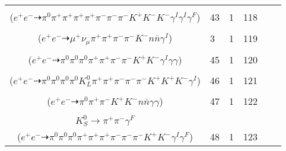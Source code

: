 \documentclass[landscape]{article}
\newcounter{rownumbers}
\newcommand\rn{\stepcounter{rownumbers}\arabic{rownumbers}}
\newcommand{\EOL}{\\} %
\newcommand{\topoTags}[1]{#1} %
\begin{document}
\begin{longtable}{clcccc}
\rn & \makecell[l]{ $ 
e^{+} e^{-} \rightarrow \pi^{0} \rho^{0} \pi^{+} \pi^{-} K^{0} \bar{K}^{*} \phi \gamma^{I} \gamma^{I} ,
\rho^{0} \rightarrow \pi^{+} \pi^{-} \gamma^{F} ,
K^{0} \rightarrow K_{S}^{0} ,
\bar{K}^{*} \rightarrow \pi^{+} K^{-} ,
\phi \rightarrow K^{+} K^{-} ,
K_{S}^{0} \rightarrow \pi^{+} \pi^{-} 
$ \\ ($
e^{+} e^{-} \dashrightarrow \pi^{0} \pi^{+} \pi^{+} \pi^{+} \pi^{+} \pi^{-} \pi^{-} \pi^{-} K^{+} K^{-} K^{-} \gamma^{I} \gamma^{I} \gamma^{F} 
$) } & \topoTags{43 & }1 & 118 \EOL

\rn & \makecell[l]{ $ 
e^{+} e^{-} \rightarrow \pi^{+} K^{0} \bar{K}^{*} \Delta^{-} \bar{n} \gamma^{I} ,
K^{0} \rightarrow K_{L}^{0} ,
\bar{K}^{*} \rightarrow \pi^{+} K^{-} ,
\Delta^{-} \rightarrow \pi^{-} n ,
K_{L}^{0} \rightarrow \mu^{+} \nu_{\mu} \pi^{-} 
$ \\ ($
e^{+} e^{-} \dashrightarrow \mu^{+} \nu_{\mu} \pi^{+} \pi^{+} \pi^{-} \pi^{-} K^{-} n \bar{n} \gamma^{I} 
$) } & \topoTags{3 & }1 & 119 \EOL

\rn & \makecell[l]{ $ 
e^{+} e^{-} \rightarrow \pi^{0} \pi^{0} \pi^{+} \rho^{-} \eta K^{*} \bar{K}^{*} \gamma^{I} ,
\rho^{-} \rightarrow \pi^{0} \pi^{-} ,
\eta \rightarrow \gamma \gamma ,
K^{*} \rightarrow \pi^{-} K^{+} ,
\bar{K}^{*} \rightarrow \pi^{+} K^{-} 
$ \\ ($
e^{+} e^{-} \dashrightarrow \pi^{0} \pi^{0} \pi^{0} \pi^{+} \pi^{+} \pi^{-} \pi^{-} K^{+} K^{-} \gamma^{I} \gamma \gamma 
$) } & \topoTags{45 & }1 & 120 \EOL

\rn & \makecell[l]{ $ 
e^{+} e^{-} \rightarrow \pi^{0} \pi^{+} \pi^{-} \rho^{-} \omega \bar{K}^{0} K^{+} K^{-} K^{*+} \gamma^{I} ,
\rho^{-} \rightarrow \pi^{0} \pi^{-} ,
\omega \rightarrow \pi^{0} \pi^{+} \pi^{-} ,
\bar{K}^{0} \rightarrow K_{L}^{0} ,
K^{*+} \rightarrow \pi^{0} K^{+} 
$ \\ ($
e^{+} e^{-} \dashrightarrow \pi^{0} \pi^{0} \pi^{0} \pi^{0} K_{L}^{0} \pi^{+} \pi^{+} \pi^{-} \pi^{-} \pi^{-} K^{+} K^{+} K^{-} \gamma^{I} 
$) } & \topoTags{46 & }1 & 121 \EOL

\rn & \makecell[l]{ $ 
e^{+} e^{-} \rightarrow \pi^{0} \pi^{-} \eta \bar{K}^{*} K^{+} n \bar{n} ,
\eta \rightarrow \gamma \gamma ,
\bar{K}^{*} \rightarrow \pi^{+} K^{-} 
$ \\ ($
e^{+} e^{-} \dashrightarrow \pi^{0} \pi^{+} \pi^{-} K^{+} K^{-} n \bar{n} \gamma \gamma 
$) } & \topoTags{47 & }1 & 122 \EOL

\rn & \makecell[l]{ $ 
e^{+} e^{-} \rightarrow \pi^{-} \omega K^{0} \bar{K}^{0} \bar{K}^{*} K^{+} \gamma^{I} ,
\omega \rightarrow \pi^{0} \pi^{+} \pi^{-} ,
K^{0} \rightarrow K_{S}^{0} ,
\bar{K}^{0} \rightarrow K_{S}^{0} ,
\bar{K}^{*} \rightarrow \pi^{+} K^{-} ,
K_{S}^{0} \rightarrow \pi^{0} \pi^{0} ,
$ \\ $
K_{S}^{0} \rightarrow \pi^{+} \pi^{-} \gamma^{F} 
$ \\ ($
e^{+} e^{-} \dashrightarrow \pi^{0} \pi^{0} \pi^{0} \pi^{+} \pi^{+} \pi^{+} \pi^{-} \pi^{-} \pi^{-} K^{+} K^{-} \gamma^{I} \gamma^{F} 
$) } & \topoTags{48 & }1 & 123 \EOL


\end{longtable}
\end{document}
